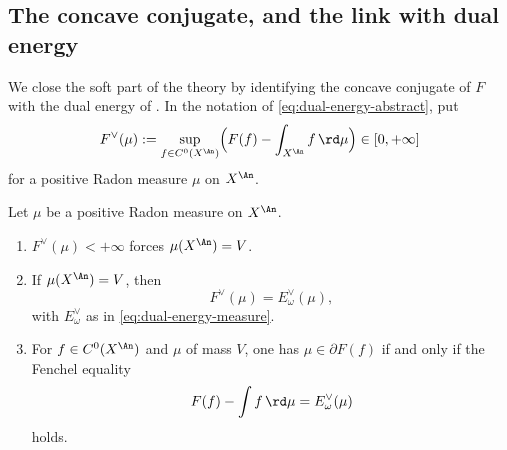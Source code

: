 \subsection{The concave conjugate, and the link with dual energy}
\label{sec:ch27-conjugate}

We close the soft part of the theory by identifying the concave conjugate of
$F$ with the dual energy of .  In
the notation of \eqref{eq:dual-energy-abstract}, put
\begin{equation}\label{eq:ch27-F-conjugate}
 F^\vee(\mu):=\sup_{f\in C^0(X^{\An})}
   \Bigl(F(f)-\int_{X^{\An}}f\,\rd\mu\Bigr)
 \in[0,+\infty]
\end{equation}
for a positive Radon measure $\mu$ on $X^{\An}$.

\begin{proposition}
\label{prop:ch27-conjugate-identification}
Let $\mu$ be a positive Radon measure on $X^{\An}$.
\begin{enumerate}
\item $F^\vee(\mu)<+\infty$ forces $\mu(X^{\An})=V$.
\item If $\mu(X^{\An})=V$, then
\begin{equation}\label{eq:ch27-conjugates-agree}
 F^\vee(\mu)=E_\omega^\vee(\mu),
\end{equation}
with $E^\vee_\omega$ as in \eqref{eq:dual-energy-measure}.
\item For $f\in C^0(X^{\An})$ and $\mu$ of mass $V$, one has
$\mu\in\partial F(f)$ if and only if the Fenchel equality
\begin{equation}\label{eq:ch27-fenchel-equality}
 F(f)-\int f\,\rd\mu=E^\vee_\omega(\mu)
\end{equation}
holds.
\end{enumerate}
\end{proposition}


